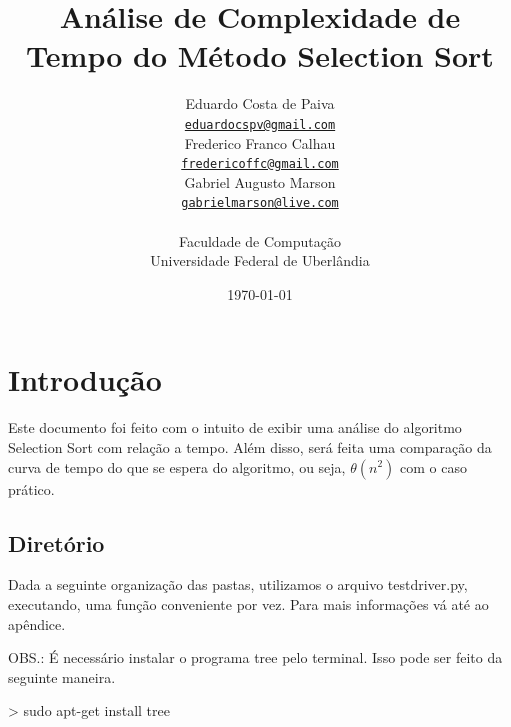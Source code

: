 \documentclass[12pt,a4paper,twoside]{report}
\title{Análise de Complexidade de Tempo do Método Selection Sort}
\date{}
\author{Eduardo Costa de Paiva \\
\texttt{\small \url{eduardocspv@gmail.com}}\\
Frederico Franco Calhau \\
\texttt{\small \url{fredericoffc@gmail.com}}\\
Gabriel Augusto Marson \\
\texttt{\small \url{gabrielmarson@live.com}}\\
\vspace{1cm} \\
Faculdade de Computação \\
Universidade Federal de Uberlândia
}
\date{\today}
\begin{document}
  \maketitle
\listoffigures
\listoftables
\lstlistoflistings

\tableofcontents


\fancyhead[RE,LO]{\thesection}

\setlength{\parskip}{0.15in} %

\chapter{Introdução}
Este documento foi feito com o intuito de exibir uma análise do algoritmo Selection Sort
com relação a tempo. Além disso, será feita uma comparação da curva de tempo do que se espera do
algoritmo, ou seja, $\theta(n^2)$ com o caso prático.

\section{Diretório}

Dada a seguinte organização das pastas, utilizamos o arquivo testdriver.py,  executando, uma função conveniente por vez. Para mais informações vá até ao apêndice.

OBS.: É necessário instalar o programa tree pelo terminal. Isso pode ser feito da seguinte maneira.

\begin{terminal}
> sudo apt-get install tree
\end{terminal}
\end{document}
